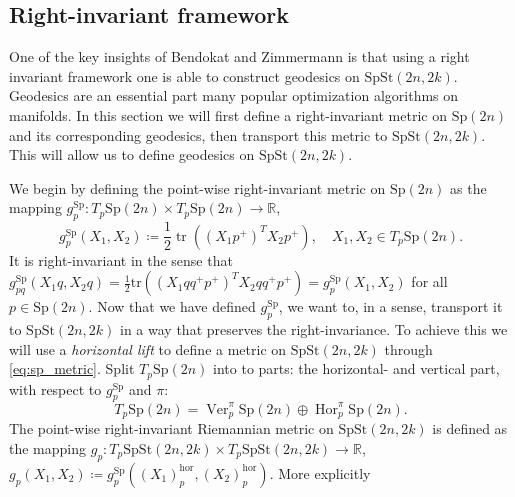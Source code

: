 \subsection{Right-invariant framework}
One of the key insights of Bendokat and Zimmermann \cite[p.~11]{BendokatZimmermann2021} is that using a right invariant framework one is able to construct geodesics on $\mathrm{SpSt}(2n, 2k)$. Geodesics are an essential part many popular optimization algorithms on manifolds. In this section we will first define a right-invariant metric on $\mathrm{Sp}(2n)$ and its corresponding geodesics, then transport this metric to $\mathrm{SpSt}(2n, 2k)$. This will allow us to define geodesics on $\mathrm{SpSt}(2n, 2k)$. 

We begin by defining the point-wise right-invariant metric on $\mathrm{Sp}(2n)$ as the mapping $g_{p}^{\mathrm{Sp}}:T_{p}\mathrm{Sp}(2n)\times T_{p}\mathrm{Sp}(2n)\xrightarrow{}\mathbb{R}$, 
\begin{equation}\label{eq:sp_metric}
    g_{p}^{\mathrm{Sp}}(X_{1},X_{2})\coloneqq\frac{1}{2}\operatorname{tr}((X_{1}p^{+})^{T}X_{2}p^{+}),\quad X_{1},X_{2}\in T_{p}\mathrm{Sp}(2n).
\end{equation}
It is right-invariant in the sense that
$g_{pq}^{\mathrm{Sp}}(X_{1}q,X_{2}q)=\tfrac{1}{2}\mathrm{tr}((X_{1}qq^{+}p^{+})^{T}X_{2}qq^{+}p^{+})=g_{p}^{\mathrm{Sp}}(X_{1},X_{2})$ for all $p\in \mathrm{Sp}(2n)$.
Now that we have defined $g_{p}^{\mathrm{Sp}}$, we want to, in a sense, transport it to $\mathrm{SpSt}(2n, 2k)$ in a way that preserves the right-invariance. To achieve this we will use a \textit{horizontal lift} to define a metric on $\mathrm{SpSt}(2n, 2k)$ through \ref{eq:sp_metric}. Split $T_{p}\mathrm{Sp}(2n)$ into to parts: the horizontal- and vertical part, with respect to $g^\mathrm{Sp}_{p}$ and $\pi$: %
\begin{equation}\label{eq:spst_split}
    T_{p}\mathrm{Sp}(2n)=\operatorname{Ver}^{\pi}_{p}\mathrm{Sp}(2n)\oplus \operatorname{Hor}^{\pi}_{p}\mathrm{Sp}(2n).
\end{equation}
The point-wise right-invariant Riemannian metric on $\mathrm{SpSt}(2n, 2k)$ is defined as the mapping $g_{p}:T_{p}\mathrm{SpSt}(2n, 2k)\times T_{p}\mathrm{SpSt}(2n, 2k)\xrightarrow{}\mathbb{R}$, $g_{p}(X_{1},X_{2})\coloneqq g^{\mathrm{Sp}}_{p}((X_{1})^{\mathrm{hor}}_{p},(X_{2})^{\mathrm{hor}}_{p})$. More explicitly

